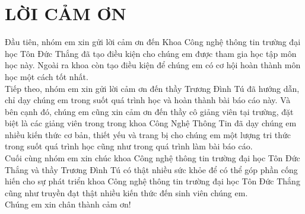 \documentclass[12pt,a4paper]{report}
\begin{document}
\section*{LỜI CẢM ƠN}
\thispagestyle{empty}
\hspace*{0.25cm}Đầu tiên, nhóm em xin gửi lời cảm ơn đến Khoa Công nghệ thông tin trường đại học Tôn Đức Thắng đã tạo điều kiện cho chúng em được tham gia học tập môn học này. Ngoài ra khoa còn tạo điều kiện để chúng em có cơ hội hoàn thành môn học một cách tốt nhất.\\
\hspace*{1cm}Tiếp theo, nhóm em xin gửi lời cảm ơn đến thầy Trương Đình Tú đã hướng dẫn, chỉ dạy chúng em trong suốt quá trình học và hoàn thành bài báo cáo này. Và bên cạnh đó, chúng em cũng xin cảm ơn đến thầy cô giảng viên tại trường, đặt biệt là  các giảng viên trong trong khoa Công Nghệ Thông Tin đã dạy chúng em nhiều kiến thức cơ bản, thiết yếu và trang bị cho chúng em một lượng tri thức trong suốt quá trình học cũng như trong quá trình làm bài báo cáo.\\
\hspace*{1cm}Cuối cùng nhóm em xin chúc khoa Công nghệ thông tin trường đại học Tôn Đức Thắng và thầy Trương Đình Tú có thật nhiều sức khỏe để có thể góp phần cống hiến cho sự phát triển khoa Công nghệ thông tin trường đại học Tôn Đức Thắng cũng như truyền đạt thật nhiều kiến thức đến sinh viên chúng em.\\
\hspace*{1cm}Chúng em xin chân thành cảm ơn!
\cleardoublepage
\end{document}
